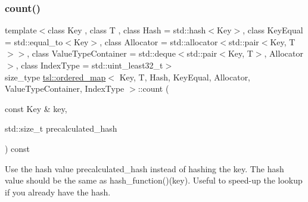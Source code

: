 \subsubsection{\texorpdfstring{count()}{count()}\hspace{0.1cm}{\footnotesize\ttfamily [1/3]}}
{\footnotesize\ttfamily template$<$class Key , class T , class Hash  = std\+::hash$<$\+Key$>$, class Key\+Equal  = std\+::equal\+\_\+to$<$\+Key$>$, class Allocator  = std\+::allocator$<$std\+::pair$<$\+Key, T$>$$>$, class Value\+Type\+Container  = std\+::deque$<$std\+::pair$<$\+Key, T$>$, Allocator$>$, class Index\+Type  = std\+::uint\+\_\+least32\+\_\+t$>$ \\
size\+\_\+type \mbox{\hyperlink{classtsl_1_1ordered__map}{tsl\+::ordered\+\_\+map}}$<$ Key, T, Hash, Key\+Equal, Allocator, Value\+Type\+Container, Index\+Type $>$\+::count (\begin{DoxyParamCaption}\item[{const Key \&}]{key,  }\item[{std\+::size\+\_\+t}]{precalculated\+\_\+hash }\end{DoxyParamCaption}) const\hspace{0.3cm}{\ttfamily [inline]}}

Use the hash value \textquotesingle{}precalculated\+\_\+hash\textquotesingle{} instead of hashing the key. The hash value should be the same as hash\+\_\+function()(key). Useful to speed-\/up the lookup if you already have the hash. \mbox{\label{classtsl_1_1ordered__map_a358979029b18f3000ad61fc329cdeab1}} 
